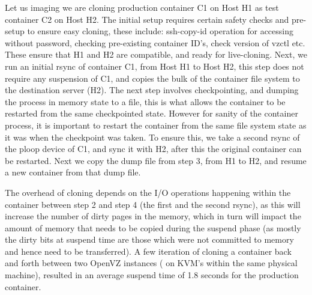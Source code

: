 Let us imaging we are cloning production container C1 on Host H1 as test container C2 on Host H2. 
The initial setup requires certain safety checks and pre-setup to ensure easy cloning, these include: ssh-copy-id operation for accessing without password, checking pre-existing container ID's, check version of vzctl etc. 
These ensure that H1 and H2 are compatible, and ready for live-cloning.
Next, we run an initial rsync of container C1, from Host H1 to Host H2, this step does not require any suspension of C1, and copies the bulk of the container file system to the destination server (H2). 
The next step involves checkpointing, and dumping the process in memory state to a file, this is what allows the container to be restarted from the same checkpointed state. 
However for sanity of the container process, it is important to restart the container from the same file system state as it was when the checkpoint was taken.
To ensure this, we take a second rsync of the ploop device of C1, and sync it with H2, after this the original container can be restarted.
Next we copy the dump file from step 3, from H1 to H2, and resume a new container from that dump file.

The overhead of cloning depends on the I/O operations happening within the container between step 2 and step 4 (the first and the second rsync), as this will increase the number of dirty pages in the memory, which in turn will impact the amount of memory that needs to be copied during the suspend phase (as mostly the dirty bits at suspend time are those which were not committed to memory and hence need to be transferred).  
A few iteration of cloning a container back and forth between two OpenVZ instances ( on KVM's within the same physical machine), resulted in an average suspend time of 1.8 seconds for the production container.
\fi


